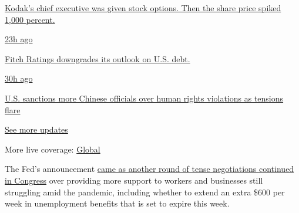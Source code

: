 \href{https://www.nytimes3xbfgragh.onion/live/2020/07/31/business/stock-market-today-coronavirus?action=click\&pgtype=Article\&state=default\&region=MAIN_CONTENT_1\&context=storylines_live_updates\#kodaks-chief-executive-was-given-stock-options-then-the-share-price-spiked-1000-percent}{Kodak's
chief executive was given stock options. Then the share price spiked
1,000 percent.}

\href{https://www.nytimes3xbfgragh.onion/live/2020/07/31/business/stock-market-today-coronavirus?action=click\&pgtype=Article\&state=default\&region=MAIN_CONTENT_1\&context=storylines_live_updates\#fitch-ratings-downgrades-its-outlook-on-us-debt}{23h
ago}

\href{https://www.nytimes3xbfgragh.onion/live/2020/07/31/business/stock-market-today-coronavirus?action=click\&pgtype=Article\&state=default\&region=MAIN_CONTENT_1\&context=storylines_live_updates\#fitch-ratings-downgrades-its-outlook-on-us-debt}{Fitch
Ratings downgrades its outlook on U.S. debt.}

\href{https://www.nytimes3xbfgragh.onion/live/2020/07/31/business/stock-market-today-coronavirus?action=click\&pgtype=Article\&state=default\&region=MAIN_CONTENT_1\&context=storylines_live_updates\#us-sanctions-more-chinese-officials-over-human-rights-violations-as-tensions-flare}{30h
ago}

\href{https://www.nytimes3xbfgragh.onion/live/2020/07/31/business/stock-market-today-coronavirus?action=click\&pgtype=Article\&state=default\&region=MAIN_CONTENT_1\&context=storylines_live_updates\#us-sanctions-more-chinese-officials-over-human-rights-violations-as-tensions-flare}{U.S.
sanctions more Chinese officials over human rights violations as
tensions flare}

\href{https://www.nytimes3xbfgragh.onion/live/2020/07/31/business/stock-market-today-coronavirus?action=click\&pgtype=Article\&state=default\&region=MAIN_CONTENT_1\&context=storylines_live_updates}{See
more updates}

More live coverage:
\href{https://www.nytimes3xbfgragh.onion/2020/08/01/world/coronavirus-covid-19.html?action=click\&pgtype=Article\&state=default\&region=MAIN_CONTENT_1\&context=storylines_live_updates}{Global}

The Fed's announcement
\href{https://www.nytimes3xbfgragh.onion/2020/07/28/business/us-lawmakers-deliberate-over-another-aid-package.html}{came
as another round of tense negotiations continued in Congress} over
providing more support to workers and businesses still struggling amid
the pandemic, including whether to extend an extra \$600 per week in
unemployment benefits that is set to expire this week.

